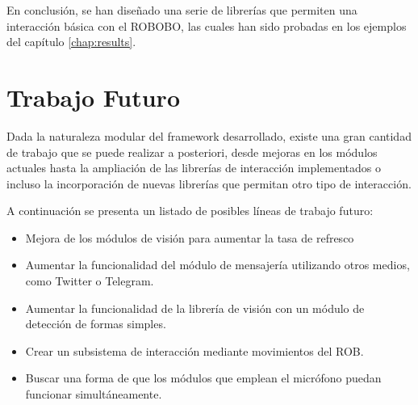  En conclusión, se han diseñado una serie de librerías que permiten una interacción básica con el ROBOBO, las cuales han sido probadas en los ejemplos del capítulo \ref{chap:results}.
 
 
 \newpage
 
\section{Trabajo Futuro}

Dada la naturaleza modular del framework desarrollado, existe una gran cantidad de trabajo que se puede realizar a posteriori, desde mejoras en los módulos actuales hasta la ampliación de las librerías de interacción implementados o incluso la incorporación de nuevas librerías que permitan otro tipo de interacción.

A continuación se presenta un listado de posibles líneas de trabajo futuro:
\begin{itemize}
	\item Mejora de los módulos de visión para aumentar la tasa de refresco
	\item Aumentar la funcionalidad del módulo de mensajería utilizando otros medios, como Twitter o Telegram.
	\item Aumentar la funcionalidad de la librería de visión con un módulo de detección de formas simples.
	\item Crear un subsistema de interacción mediante movimientos del ROB.
	\item Buscar una forma de que los módulos que emplean el micrófono puedan funcionar simultáneamente.
\end{itemize}